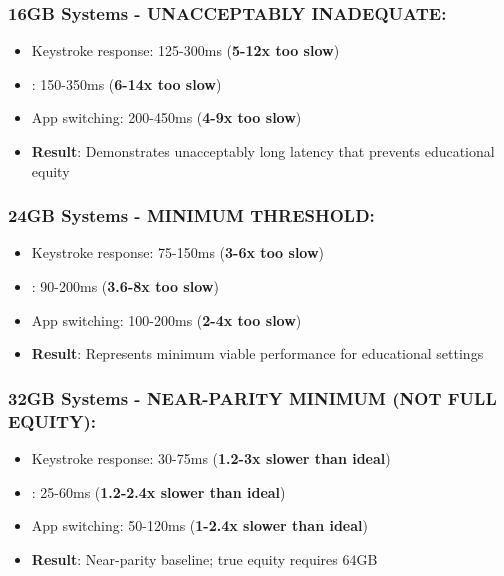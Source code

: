 \subsubsection{16GB Systems - UNACCEPTABLY INADEQUATE:}

\begin{itemize}
	\item Keystroke response: 125-300ms (\textbf{5-12x too slow})
	\item {}: 150-350ms (\textbf{6-14x too slow})
	\item App switching: 200-450ms (\textbf{4-9x too slow})
	\item \textbf{Result}: Demonstrates unacceptably long latency that prevents educational equity \supercite{EducationalEquityReport2024}
\end{itemize}


\subsubsection{24GB Systems - MINIMUM THRESHOLD:}

\begin{itemize}
	\item Keystroke response: 75-150ms (\textbf{3-6x too slow})
	\item {}: 90-200ms (\textbf{3.6-8x too slow})
	\item App switching: 100-200ms (\textbf{2-4x too slow})
	\item \textbf{Result}: Represents minimum viable performance for educational settings \supercite{EducationalEquityReport2024}
\end{itemize}


\subsubsection{32GB Systems - NEAR-PARITY MINIMUM (NOT FULL EQUITY):}

\begin{itemize}
	\item Keystroke response: 30-75ms (\textbf{1.2-3x slower than ideal})
	\item {}: 25-60ms (\textbf{1.2-2.4x slower than ideal})
	\item App switching: 50-120ms (\textbf{1-2.4x slower than ideal})
	\item \textbf{Result}: Near-parity baseline; true equity requires 64GB \supercite{EducationalEquityReport2024}
\end{itemize}


